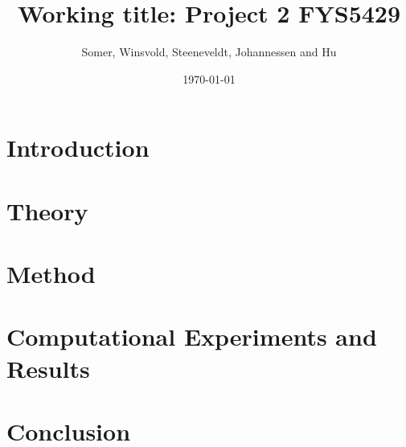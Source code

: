 \documentclass[aps,rmp,reprint,amsmath,amssymb,longbibliography,twocolumn,floatfix]{revtex4-1}
\begin{document}
\title{Working title: Project 2 FYS5429}

\author{Somer, Winsvold, Steeneveldt, Johannessen and Hu}
\date{\today}


\begin{abstract}

\end{abstract}

\maketitle

\tableofcontents

\section{Introduction}
\label{sec:introduction}

\section{Theory}
\label{sec:theory}

\section{Method}
\label{sec:method}

\section{Computational Experiments and Results}



\label{sec:results}

\section{Conclusion}
\label{sec:conclusion}

\newpage

\appendix

\end{document}
